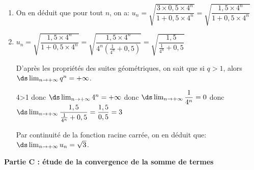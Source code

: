 \begin{enumerate}
\begin{enumerate}
Donc la suite $(v_n)$ est géométrique de premier terme $v_0=0,5$ et de raison $q=4$.

		\item%

On en déduit que pour tout $n$, on a:
$u_n=\sqrt{\dfrac{3\times 0,5 \times 4^n}{1+0,5\times 4^n}}
=\sqrt{\dfrac{1,5 \times 4^n}{1+0,5\times 4^n}}$

		\item%
$u_n = \sqrt{\dfrac{1,5 \times 4^n}{1+0,5\times 4^n}} = \sqrt{\dfrac{1,5 \times 4^n}{4^n \left ( \frac{1}{4^n}+0,5\right )}} = \sqrt{\dfrac{1,5}{ \frac{1}{4^n}+0,5}}$		

D'après les propriétés des suites géométriques, on sait que si $q>1$, alors $\ds\lim_{n\to +\infty} q^n=+\infty$.

4>1 donc $\ds\lim_{n\to +\infty}4^n=+\infty$ donc
$\ds\lim_{n\to +\infty} \dfrac{1}{4^n} =0$ donc
$\ds\lim_{n\to +\infty} \dfrac{1,5}{\frac{1}{4^n}+0,5}= \dfrac{1,5}{0,5} = 3$

Par continuité de la fonction racine carrée, on en déduit que: $\ds\lim_{n\to +\infty} u_n=\sqrt{3}$.
	\end{enumerate}
\end{enumerate}

\medskip

\textbf{Partie C : étude de la convergence de la somme de termes}


